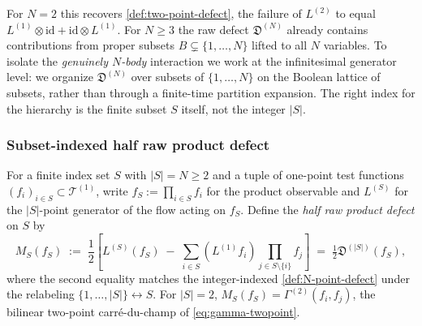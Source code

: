 \documentclass[11pt,reqno]{amsart}
\theoremstyle{plain}
\theoremstyle{definition}
\theoremstyle{remark}
\begin{document}
For $N=2$ this recovers \cref{def:two-point-defect}, the failure of
$L^{(2)}$ to equal
$L^{(1)}\otimes\mathrm{id}+\mathrm{id}\otimes L^{(1)}$. For $N\ge 3$
the raw defect $\mathfrak D^{(N)}$ already contains contributions
from proper subsets $B\subsetneq\{1,\ldots,N\}$ lifted to all $N$
variables. To isolate the \emph{genuinely $N$-body} interaction we
work at the infinitesimal generator level: we organize
$\mathfrak D^{(N)}$ over subsets of $\{1,\ldots,N\}$ on the Boolean
lattice of subsets, rather than through a finite-time partition
expansion. The right index for the hierarchy is the finite subset
$S$ itself, not the integer $|S|$.

\subsubsection*{Subset-indexed half raw product defect}

For a finite index set $S$ with $|S|=N\ge 2$ and a tuple of one-point
test functions $(f_i)_{i\in S}\subset\mathcal T^{(1)}$, write
$f_S:=\prod_{i\in S}f_i$ for the product observable and $L^{(S)}$
for the $|S|$-point generator of the flow acting on $f_S$. Define the
\emph{half raw product defect} on $S$ by
\begin{equation}\label{eq:M-S}
  M_S(f_S)
  \;:=\;
  \frac{1}{2}\!\left[
    L^{(S)}(f_S)
    \;-\;
    \sum_{i\in S}(L^{(1)}f_i)\prod_{j\in S\setminus\{i\}}f_j
  \right]
  \;=\;\tfrac{1}{2}\mathfrak D^{(|S|)}(f_S),
\end{equation}
where the second equality matches the integer-indexed
\cref{def:N-point-defect} under the relabeling
$\{1,\ldots,|S|\}\leftrightarrow S$. For $|S|=2$,
$M_S(f_S)=\Gamma^{(2)}(f_i,f_j)$, the bilinear two-point
carr\'e-du-champ of \eqref{eq:gamma-twopoint}.
\end{document}

